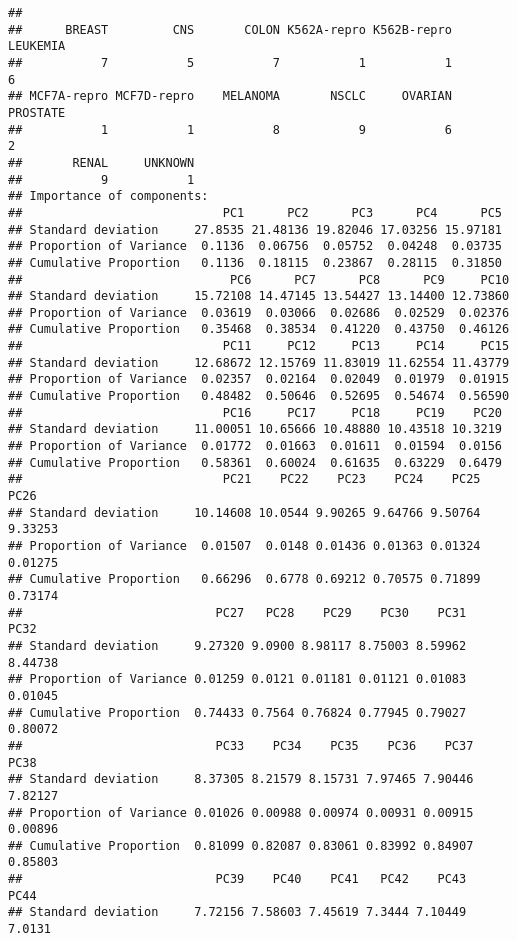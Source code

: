 \documentclass[]{article}
\begin{document}
\begin{verbatim}
## 
##      BREAST         CNS       COLON K562A-repro K562B-repro    LEUKEMIA 
##           7           5           7           1           1           6 
## MCF7A-repro MCF7D-repro    MELANOMA       NSCLC     OVARIAN    PROSTATE 
##           1           1           8           9           6           2 
##       RENAL     UNKNOWN 
##           9           1 
## Importance of components:
##                            PC1      PC2      PC3      PC4      PC5
## Standard deviation     27.8535 21.48136 19.82046 17.03256 15.97181
## Proportion of Variance  0.1136  0.06756  0.05752  0.04248  0.03735
## Cumulative Proportion   0.1136  0.18115  0.23867  0.28115  0.31850
##                             PC6      PC7      PC8      PC9     PC10
## Standard deviation     15.72108 14.47145 13.54427 13.14400 12.73860
## Proportion of Variance  0.03619  0.03066  0.02686  0.02529  0.02376
## Cumulative Proportion   0.35468  0.38534  0.41220  0.43750  0.46126
##                            PC11     PC12     PC13     PC14     PC15
## Standard deviation     12.68672 12.15769 11.83019 11.62554 11.43779
## Proportion of Variance  0.02357  0.02164  0.02049  0.01979  0.01915
## Cumulative Proportion   0.48482  0.50646  0.52695  0.54674  0.56590
##                            PC16     PC17     PC18     PC19    PC20
## Standard deviation     11.00051 10.65666 10.48880 10.43518 10.3219
## Proportion of Variance  0.01772  0.01663  0.01611  0.01594  0.0156
## Cumulative Proportion   0.58361  0.60024  0.61635  0.63229  0.6479
##                            PC21    PC22    PC23    PC24    PC25    PC26
## Standard deviation     10.14608 10.0544 9.90265 9.64766 9.50764 9.33253
## Proportion of Variance  0.01507  0.0148 0.01436 0.01363 0.01324 0.01275
## Cumulative Proportion   0.66296  0.6778 0.69212 0.70575 0.71899 0.73174
##                           PC27   PC28    PC29    PC30    PC31    PC32
## Standard deviation     9.27320 9.0900 8.98117 8.75003 8.59962 8.44738
## Proportion of Variance 0.01259 0.0121 0.01181 0.01121 0.01083 0.01045
## Cumulative Proportion  0.74433 0.7564 0.76824 0.77945 0.79027 0.80072
##                           PC33    PC34    PC35    PC36    PC37    PC38
## Standard deviation     8.37305 8.21579 8.15731 7.97465 7.90446 7.82127
## Proportion of Variance 0.01026 0.00988 0.00974 0.00931 0.00915 0.00896
## Cumulative Proportion  0.81099 0.82087 0.83061 0.83992 0.84907 0.85803
##                           PC39    PC40    PC41   PC42    PC43   PC44
## Standard deviation     7.72156 7.58603 7.45619 7.3444 7.10449 7.0131

\end{verbatim}
\end{document}
